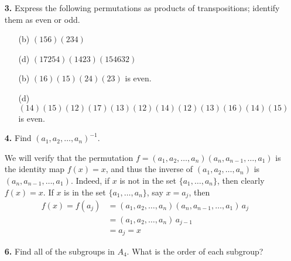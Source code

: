 \documentclass[12pt,reqno]{amsart}
\newcommand{\<}{\ensuremath{\langle}}
\renewcommand{\>}{\ensuremath{\rangle}}
\begin{document}
\begin{enumerate}[{\bf 1.}]
\item[{\bf 3.}] 
Express the following permutations as products of transpositions;
identify them as even or odd. 

\bigskip

\begin{multicols}{2}
\begin{enumerate}
 \item[(b)]
$(156)(234)$
\vskip1cm
 \item[(d)]
$(17254)(1423)(154632)$
\end{enumerate}
\end{multicols}

\bigskip
{}
\begin{multicols}{2}
\begin{enumerate}
 \item[(b)]
$(16)(15)(24)(23)$ is even.
\vskip1cm
 \item[(d)]
$(14)(15)(12)(17)(13)(12)(14)(12)(13)(16)(14)(15)$
 is even.
\end{enumerate}
\end{multicols}

\bigskip
 
\item[{\bf 4.}] 
Find $(a_1, a_2, \ldots, a_n)^{-1}$.

\bigskip
{} We will verify that the permutation
$f= (a_1, a_2, \ldots, a_n) (a_n, a_{n-1}, \ldots, a_1)$ 
is the identity map $f(x) = x$, and thus the inverse
of $(a_1, a_2, \ldots, a_n)$ is  $(a_n, a_{n-1}, \ldots, a_1)$.
Indeed, if $x$ is not in the set $\{a_1, \dots,a_n\}$, 
then clearly $f(x) = x$.  If $x$ is in the set
 $\{a_1, \dots,a_n\}$, say $x = a_j$, then 
\begin{align*}
f(x) = f(a_j) %
 &=  (a_1, a_2, \ldots, a_n) (a_n, a_{n-1}, \ldots, a_1)\, a_j\\
&=(a_1, a_2, \ldots, a_n) \,a_{j-1}\\
&=a_j =  x
\end{align*}

\newpage
 
\item[{\bf 6.}] 
Find all of the subgroups in $A_4$. What is the order of each
subgroup? 
 

\end{enumerate}
\end{document}
